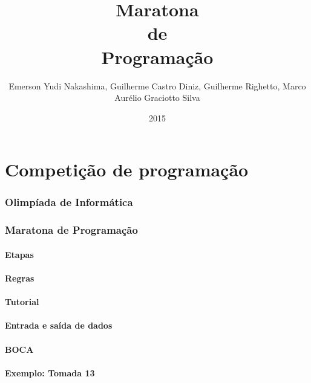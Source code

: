 \documentclass[utf8, usepdftitle=false, svgnames, color={table,
fixpdftex, hyperref, fixinclude, xcdraw}, t, brazil]{beamer}
\title{Maratona\\de\\Programação}
\author[UTFPR-CM]{Emerson Yudi Nakashima, Guilherme Castro Diniz, Guilherme Righetto, Marco Aurélio Graciotto Silva}
\date[]{2015}
\begin{document}
\frontmatter{}


\part{Competição de programação}


\section{Olimpíada de Informática}



\section{Maratona de Programação}

 
\subsection{Etapas}

 
\subsection{Regras}

 
\subsection{Tutorial}


\subsection{Entrada e saída de dados}

 
\subsection{BOCA}

 
\subsection{Exemplo: Tomada 13}

 
\end{document}
